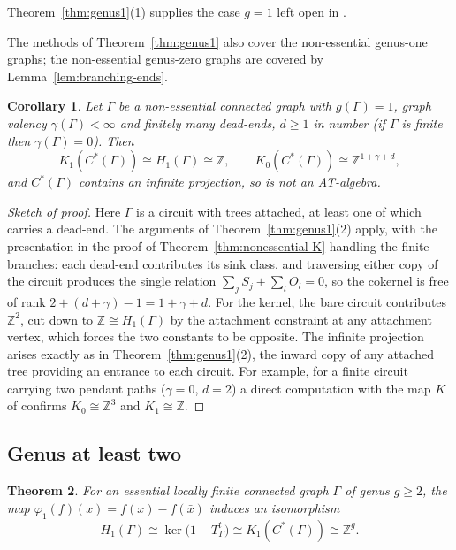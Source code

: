 \documentclass[12pt,reqno]{amsart}
\theoremstyle{plain}
\newtheorem{theorem}{Theorem}[section]
\newtheorem{corollary}[theorem]{Corollary}
\theoremstyle{definition}
\newcommand{\Z}{\mathbb{Z}}
\begin{document}
Theorem~\ref{thm:genus1}(1) supplies the case $g=1$ left open in \cite{CLM}.

The methods of Theorem~\ref{thm:genus1} also cover the non-essential genus-one graphs; the
non-essential genus-zero graphs are covered by Lemma~\ref{lem:branching-ends}.

\begin{corollary}\label{cor:genus-one-nonessential}
Let $\Gamma$ be a non-essential connected graph with $g(\Gamma)=1$, graph valency
$\gamma(\Gamma)<\infty$ and finitely many dead-ends, $d\ge 1$ in number \textup(if $\Gamma$ is
finite then $\gamma(\Gamma)=0$\textup). Then
\[
K_1(C^*(\Gamma))\cong H_1(\Gamma)\cong\Z,\qquad K_0(C^*(\Gamma))\cong\Z^{1+\gamma+d},
\]
and $C^*(\Gamma)$ contains an infinite projection, so is not an AT-algebra.
\end{corollary}

\begin{proof}[Sketch of proof]
Here $\Gamma$ is a circuit with trees attached, at least one of which carries a dead-end. The
arguments of Theorem~\ref{thm:genus1}(2) apply, with the presentation in the proof of
Theorem~\ref{thm:nonessential-K} handling the finite branches: each dead-end contributes its sink
class, and traversing either copy of the circuit produces the single relation
$\sum_jS_j+\sum_lO_l=0$, so the cokernel is free of rank $2+(d+\gamma)-1=1+\gamma+d$. For the
kernel, the bare circuit contributes $\Z^{2}$, cut down to $\Z\cong H_1(\Gamma)$ by the attachment
constraint at any attachment vertex, which forces the two constants to be opposite. The infinite
projection arises exactly as in Theorem~\ref{thm:genus1}(2), the inward copy of any attached tree
providing an entrance to each circuit. For example, for a finite circuit carrying two pendant
paths \textup($\gamma=0$, $d=2$\textup) a direct computation with the map $K$ of
\cite[Theorem~3.2]{RS} confirms $K_0\cong\Z^{3}$ and $K_1\cong\Z$.
\end{proof}

\subsection*{Genus at least two}

\begin{theorem}\label{thm:K1-homology}
For an essential locally finite connected graph $\Gamma$ of genus $g\ge 2$, the map
$\varphi_1(f)(x)=f(x)-f(\bar x)$ induces an isomorphism
\[
H_1(\Gamma)\cong\ker\!\big(1-T_\Gamma^{t}\big)\cong K_1(C^*(\Gamma))\cong\Z^{g}.
\]
\end{theorem}
\end{document}

